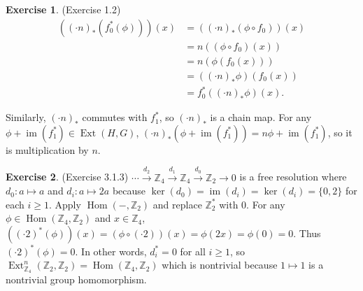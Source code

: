 \documentclass[12pt, psamsfonts]{amsart}
\theoremstyle{definition}
\newtheorem*{exer}{Exercise}
\theoremstyle{remark}
\DeclareMathOperator{\Hom}{Hom}
\DeclareMathOperator{\Ext}{Ext}
\DeclareMathOperator{\Hom}{Hom}
\DeclareMathOperator{\im}{im}
\numberwithin{equation}{section}
\begin{document}
\begin{exer}{(Exercise 1.2)}
  \begin{align*}
    ((\cdot n)_{\ast}(f_0^{\ast}(\phi)))(x)
      &= ((\cdot n)_{\ast}(\phi \circ f_0))(x) \\
      &= n((\phi \circ f_0)(x)) \\
      &= n(\phi(f_0(x))) \\
      &= ((\cdot n)_{\ast}\phi)(f_0(x)) \\
      &= f_0^{\ast}((\cdot n)_{\ast}\phi)(x).
  \end{align*}

  Similarly, $(\cdot n)_{\ast}$ commutes with $f_1^{\ast}$, so $(\cdot n)_{\ast}$ is a chain map.
  For any $\phi + \im(f_1^{\ast}) \in \Ext(H, G)$, $(\cdot n)_{\ast}(\phi + \im(f_1^{\ast})) = n\phi + \im(f_1^{\ast})$, so it is multiplication by $n$.
\end{exer}

\begin{exer}{(Exercise 3.1.3)}
  $\cdots \xrightarrow{d_2} \mathbb{Z}_4 \xrightarrow{d_1} \mathbb{Z}_4 \xrightarrow{d_0} \mathbb{Z}_2 \rightarrow 0$ is a free resolution where $d_0: a \mapsto a$ and $d_i: a \mapsto 2a$ because $\ker(d_0) = \im(d_i) = \ker(d_i) = \{ 0 , 2 \}$ for each $i \geq 1$.
  Apply $\Hom(-, \mathbb{Z}_2)$ and replace $\mathbb{Z}_2^{\ast}$ with 0.
  For any $\phi \in \Hom(\mathbb{Z}_4, \mathbb{Z}_2)$ and $x \in \mathbb{Z}_4$, $((\cdot 2)^{\ast}(\phi))(x) = (\phi \circ (\cdot 2))(x) = \phi(2x) = \phi(0) = 0$.
  Thus $(\cdot 2)^{\ast}(\phi) = 0$.
  In other words, $d_i^{\ast} = 0$ for all $i \geq 1$, so $\Ext^n_{\mathbb{Z}_4}(\mathbb{Z}_2, \mathbb{Z}_2) = \Hom(\mathbb{Z}_4, \mathbb{Z}_2)$ which is nontrivial because $1 \mapsto 1$ is a nontrivial group homomorphism.
\end{exer}
\end{document}

